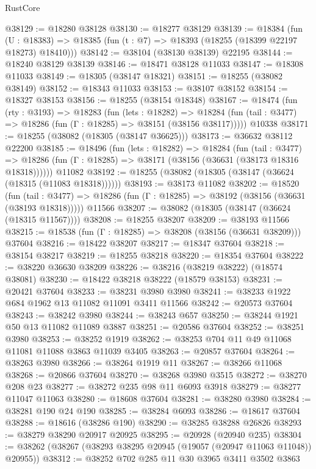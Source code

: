 \begin{lexlean}{RustCore}
\begin{coremodule}
@38129 := @18280 @38128
@38130 := @18277 @38129
@38139 := @18384
    (fun (U : @18383) => @18385 (fun (t : @7) => @18393 (@18255 (@18399 @22197 @18273) @18410)))
@38142 := @38104 (@38130 @38139) @22195
@38144 := @18240 @38129 @38139
@38146 := @18471 @38128 @11033
@38147 := @18308 @11033
@38149 := @18305 (@38147 @18321)
@38151 := @18255 (@38082 @38149)
@38152 := @18343 @11033
@38153 := @38107 @38152
@38154 := @18327 @38153
@38156 := @18255 (@38154 @18348)
@38167 := @18474
    (fun (rty : @3193) =>
    @18283
      (fun (lets : @18282) =>
      @18284 (fun (tail : @3477) => @18286 (fun (Γ : @18285) => @38151 (@38156 @38117)))))
    @10338
@38171 := @18255 (@38082 (@18305 (@38147 @36625)))
@38173 := @36632 @38112 @22200
@38185 := @18496
    (fun (lets : @18282) =>
    @18284
      (fun (tail : @3477) =>
      @18286 (fun (Γ : @18285) => @38171 (@38156 (@36631 (@38173 @18316 @18318))))))
    @11082
@38192 := @18255 (@38082 (@18305 (@38147 (@36624 (@18315 (@11083 @18318))))))
@38193 := @38173 @11082
@38202 := @18520
    (fun (tail : @3477) => @18286 (fun (Γ : @18285) => @38192 (@38156 (@36631 (@38193 @18318)))))
    @11566
@38207 := @38082 (@18305 (@38147 (@36624 (@18315 @11567))))
@38208 := @18255 @38207
@38209 := @38193 @11566
@38215 := @18538 (fun (Γ : @18285) => @38208 (@38156 (@36631 @38209))) @37604
@38216 := @18422 @38207
@38217 := @18347 @37604
@38218 := @38154 @38217
@38219 := @18255 @38218
@38220 := @18354 @37604
@38222 := @38220 @36630 @38209
@38226 := @38216 (@38219 @38222) (@18574 @38081)
@38230 := @18422 @38218 @38222 (@18579 @38153)
@38231 := @20421 @37604
@38233 := @38231 @3980 @3980
@38241 := @38233 @1922 @684 @1962 @13 @11082 @11091 @3411 @11566
@38242 := @20573 @37604
@38243 := @38242 @3980
@38244 := @38243 @657
@38250 := @38244 @1921 @50 @13 @11082 @11089 @3887
@38251 := @20586 @37604
@38252 := @38251 @3980
@38253 := @38252 @1919
@38262 := @38253 @704 @11 @49 @11068 @11081 @11088 @3863 @11039 @3405
@38263 := @20857 @37604
@38264 := @38263 @3980
@38266 := @38264 @1919 @11
@38267 := @38266 @11068
@38268 := @20866 @37604
@38270 := @38268 @3980 @3515
@38272 := @38270 @208 @23
@38277 := @38272 @235 @98 @11 @6093 @3918
@38279 := @38277 @11047 @11063
@38280 := @18608 @37604
@38281 := @38280 @3980
@38284 := @38281 @190 @24 @190
@38285 := @38284 @6093
@38286 := @18617 @37604
@38288 := @18616 (@38286 @190)
@38290 := @38285 @38288 @26826
@38293 := @38279 @38290 @20917 @20925
@38295 := @20928 (@20940 @235)
@38304 := @38262 (@38267 (@38293 @38295 @20945 (@19057 (@20947 @11063 @11048)) @20955))
@38312 := @38252 @702 @285 @11 @30 @3965 @3411 @3502 @3863

\end{coremodule}
\end{lexlean}
